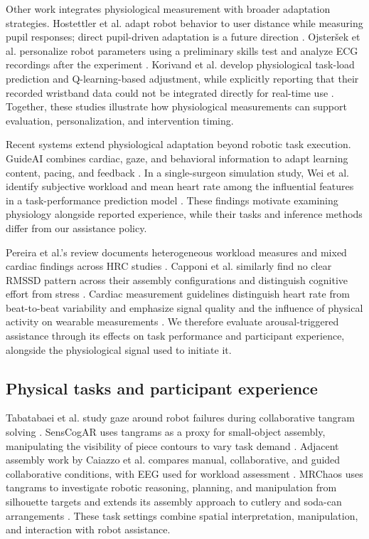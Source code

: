 \documentclass[sigconf,anonymous,balance=false]{aamas}
\providecommand{\DIFadd}[1]{{\protect\color{blue} \sf #1}} %
\providecommand{\DIFaddbegin}{} %
\providecommand{\DIFaddend}{} %
\begin{document}
Other work integrates physiological measurement with broader adaptation strategies. Hostettler et al. adapt robot behavior to user distance while measuring pupil responses; direct pupil-driven adaptation is a future direction \cite{hostettler2025}. Ojsteršek et al. personalize robot parameters using a preliminary skills test and analyze ECG recordings after the experiment \cite{ojstersek2024}. Korivand et al. develop physiological task-load prediction and Q-learning-based adjustment, while explicitly reporting that their recorded wristband data could not be integrated directly for real-time use \cite{korivand2024}. Together, these studies illustrate how physiological measurements can support evaluation, personalization, and intervention timing.

\DIFaddbegin \DIFadd{Recent systems extend physiological adaptation beyond robotic task execution. GuideAI combines cardiac, gaze, and behavioral information to adapt learning content, pacing, and feedback \cite{shukla2026}. In a single-surgeon simulation study, Wei et al. identify subjective workload and mean heart rate among the influential features in a task-performance prediction model \cite{wei2025}. These findings motivate examining physiology alongside reported experience, while their tasks and inference methods differ from our assistance policy.
}

\DIFaddend Pereira et al.'s review documents heterogeneous workload measures and mixed cardiac findings across HRC studies \cite{pereira2025}. Capponi et al. similarly find no clear RMSSD pattern across their assembly configurations and distinguish cognitive effort from stress \cite{capponi2024}. \DIFaddbegin \DIFadd{Cardiac measurement guidelines distinguish heart rate from beat-to-beat variability and emphasize signal quality and the influence of physical activity on wearable measurements \cite{quigley2024}. }\DIFaddend We therefore evaluate arousal-triggered assistance through its effects on task performance and participant experience, alongside the physiological signal used to initiate it.

\subsection{Physical tasks and participant experience}

Tabatabaei et al. study gaze around robot failures during collaborative tangram solving \cite{tabatabaei2025}. SensCogAR uses tangrams as a proxy for small-object assembly, manipulating the visibility of piece contours to vary task demand \cite{melo2026}. Adjacent assembly work by Caiazzo et al. compares manual, collaborative, and guided collaborative conditions, with EEG used for workload assessment \cite{caiazzo2024}. \DIFaddbegin \DIFadd{MRChaos uses tangrams to investigate robotic reasoning, planning, and manipulation from silhouette targets and extends its assembly approach to cutlery and soda-can arrangements \cite{zhao2025}. }\DIFaddend These task settings combine spatial interpretation, manipulation, and interaction with robot assistance.
\end{document}
